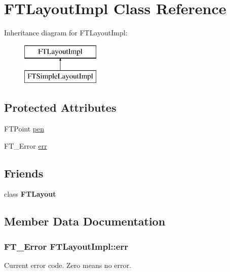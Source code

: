 \hypertarget{class_f_t_layout_impl}{}\section{F\+T\+Layout\+Impl Class Reference}
\label{class_f_t_layout_impl}
Inheritance diagram for F\+T\+Layout\+Impl\+:\begin{figure}[H]
\begin{center}
\leavevmode
\includegraphics[height=2.000000cm]{class_f_t_layout_impl}
\end{center}
\end{figure}
\subsection*{Protected Attributes}
\begin{DoxyCompactItemize}
\item 
F\+T\+Point \hyperlink{class_f_t_layout_impl_aefaff875c0cf4fe5710897f614be44ac}{pen}
\item 
F\+T\+\_\+\+Error \hyperlink{class_f_t_layout_impl_af3c9ad6d6636a69a6643d68383e4edcd}{err}
\end{DoxyCompactItemize}
\subsection*{Friends}
\begin{DoxyCompactItemize}
\item 
class {\bfseries F\+T\+Layout}\hypertarget{class_f_t_layout_impl_a28e6cd087379e90923b29b9c2c103aa8}{}\label{class_f_t_layout_impl_a28e6cd087379e90923b29b9c2c103aa8}

\end{DoxyCompactItemize}


\subsection{Member Data Documentation}
\subsubsection[{\texorpdfstring{err}{err}}]{\setlength{\rightskip}{0pt plus 5cm}F\+T\+\_\+\+Error F\+T\+Layout\+Impl\+::err\hspace{0.3cm}{\ttfamily [protected]}}\hypertarget{class_f_t_layout_impl_af3c9ad6d6636a69a6643d68383e4edcd}{}\label{class_f_t_layout_impl_af3c9ad6d6636a69a6643d68383e4edcd}
Current error code. Zero means no error. 
